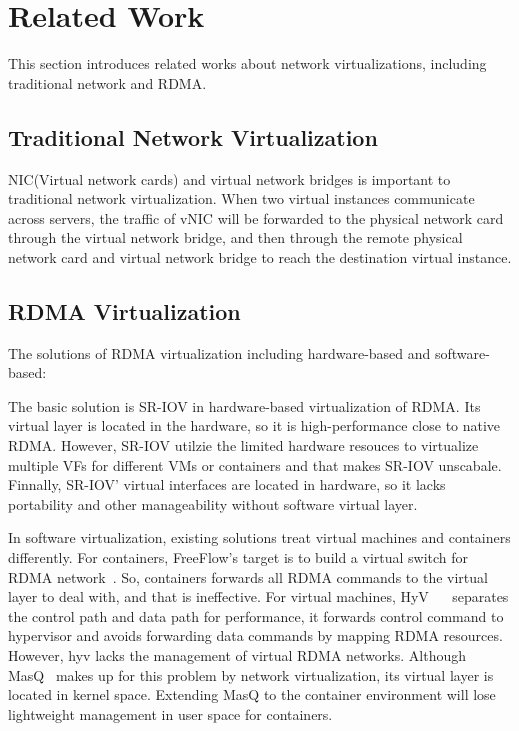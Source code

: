 \section{Related Work}
This section introduces related works about network virtualizations, including traditional network and RDMA.

\subsection{Traditional Network Virtualization}
NIC(Virtual network cards) and virtual network bridges is important to traditional network virtualization. When two virtual instances communicate across servers, the traffic of vNIC will be forwarded to the physical network card through the virtual network bridge, and then through the remote physical network card and virtual network bridge to reach the destination virtual instance.


\subsection{RDMA Virtualization}
The solutions of RDMA virtualization including hardware-based  and software-based:

The basic solution is SR-IOV in hardware-based virtualization of RDMA. Its virtual layer is located in the hardware, so it is high-performance close to native RDMA. However, SR-IOV utilzie the limited hardware resouces to virtualize multiple VFs for different VMs or containers and that makes SR-IOV unscabale. Finnally, SR-IOV' virtual interfaces are located in hardware, so it lacks portability and other manageability without software virtual layer. 

In software virtualization, existing solutions treat virtual machines and containers differently. For containers, FreeFlow's target is to build a virtual switch for RDMA network~\cite{kim2019freeflow}. So, containers forwards all RDMA commands to the virtual layer to deal with, and that is ineffective. For virtual machines, HyV~\cite{pfefferle2015hybrid} ~\cite{pfefferle2014vverbs} separates the control path and data path for performance, it forwards control command to hypervisor and avoids forwarding data commands by mapping RDMA resources. However, hyv lacks the management of virtual RDMA networks. Although MasQ~\cite{he2020masq} makes up for this problem by network virtualization, its virtual layer is located in kernel space. Extending MasQ to the container environment will lose lightweight  management in user space for containers.




